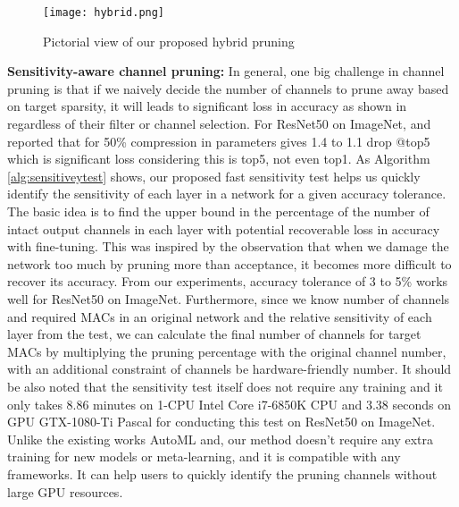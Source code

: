 \documentclass{article}
\begin{document}
\begin{figure*}[!htbp]
\vspace{-2mm}
\begin{center}
\texttt{[image: hybrid.png]}
\end{center}
\caption{Pictorial view of our proposed hybrid pruning}
\label{fig:overview}
\vspace{-2mm}
\end{figure*} 

\textbf{Sensitivity-aware channel pruning:} %
In general, one big challenge in channel pruning is that if we naively decide the number of channels to prune away based on target sparsity, it will leads to significant loss in accuracy as shown in  \cite{Li2016PruningFF}\cite{Molchanov2016PruningCN}\cite{luo2017thinet}\cite{He_2017_ICCV}\cite{Liu2017learning} regardless of their filter or channel selection. For ResNet50 on ImageNet, \cite{He_2017_ICCV} and \cite{luo2017thinet} reported that for 50\% compression in parameters gives 1.4 to 1.1 drop @top5 which is significant loss considering this is top5, not even top1. 
As Algorithm \ref{alg:sensitiveytest} shows, our proposed fast sensitivity test helps us quickly identify the sensitivity of each layer in a network for a given accuracy tolerance. The basic idea is to find the upper bound in the percentage of the number of intact output channels in each layer with potential recoverable loss in accuracy with fine-tuning. This was inspired by the observation that when we damage the network too much by pruning more than acceptance, it becomes more difficult to recover its accuracy. From our experiments, accuracy tolerance of 3 to 5\% works well for ResNet50 on ImageNet. %
Furthermore, since we know number of channels and required MACs in an original network and the relative sensitivity of each layer from the test, we can calculate the final number of channels for target MACs by multiplying the pruning percentage with the original channel number, with an additional constraint of channels be hardware-friendly number.
It should be also noted that the sensitivity test itself does not require any training and it only takes 8.86 minutes on 1-CPU Intel Core i7-6850K CPU and 3.38 seconds on GPU GTX-1080-Ti Pascal for conducting this test on ResNet50 on ImageNet. Unlike the existing works AutoML\cite{he2018amc} and\cite{chin2018layer}, our method doesn't require any extra training for new models or meta-learning, and it is compatible with any frameworks. It can help users to quickly identify the pruning channels without large GPU resources.
\end{document}
